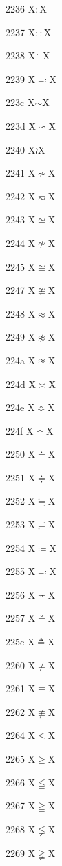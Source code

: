 \documentclass[11pt]{article}
\begin{document}
2236 X{\ensuremath{\mathrel{:}}}X

2237 X{\ensuremath{\mathrel{::}}}X

2238 X{\ensuremath{\dot{-}}}X

2239 X{\ensuremath{\eqcolon}}X

223c X{\ensuremath{\sim}}X

223d X{\ensuremath{\backsim}}X

2240 X{\ensuremath{\wr}}X

2241 X{\ensuremath{\nsim}}X

2242 X{\ensuremath{\eqsim}}X

2243 X{\ensuremath{\simeq}}X

2244 X{\ensuremath{\nsimeq}}X

2245 X{\ensuremath{\cong}}X

2247 X{\ensuremath{\ncong}}X

2248 X{\ensuremath{\approx}}X

2249 X{\ensuremath{\napprox}}X

224a X{\ensuremath{\approxeq}}X

224d X{\ensuremath{\asymp}}X

224e X{\ensuremath{\Bumpeq}}X

224f X{\ensuremath{\bumpeq}}X

2250 X{\ensuremath{\doteq}}X

2251 X{\ensuremath{\doteqdot}}X

2252 X{\ensuremath{\fallingdotseq}}X

2253 X{\ensuremath{\risingdotseq}}X

2254 X{\ensuremath{\coloneq}}X

2255 X{\ensuremath{\eqcolon}}X

2256 X{\ensuremath{\eqcirc}}X

2257 X{\ensuremath{\circeq}}X

225c X{\ensuremath{\triangleq}}X

2260 X{\ensuremath{\ne}}X

2261 X{\ensuremath{\equiv}}X

2262 X{\ensuremath{\nequiv}}X

2264 X{\ensuremath{\leq}}X

2265 X{\ensuremath{\geq}}X

2266 X{\ensuremath{\leqq}}X

2267 X{\ensuremath{\geqq}}X

2268 X{\ensuremath{\lneqq}}X

2269 X{\ensuremath{\gneqq}}X
\end{document}
